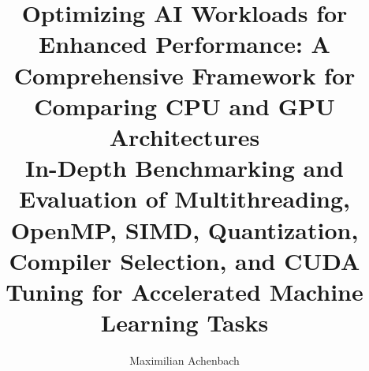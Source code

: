 \documentclass[modern,longauthor]{aastex7}
\begin{document}
\title{
Optimizing AI Workloads for Enhanced Performance: A Comprehensive Framework for Comparing CPU and GPU Architectures
\vspace{1mm}
\\\small\textnormal{In-Depth Benchmarking and Evaluation of Multithreading, OpenMP, SIMD, Quantization, Compiler Selection, and CUDA Tuning for Accelerated Machine Learning Tasks}
\vspace{1mm}
}
\author[]{Maximilian Achenbach}
\end{document}
